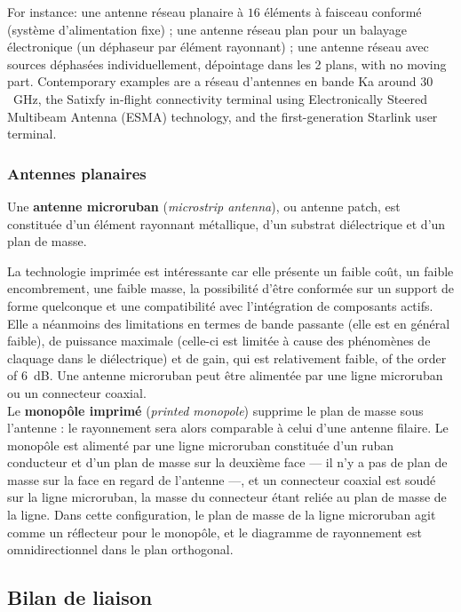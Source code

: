 For instance: une antenne réseau planaire à $16$ éléments à faisceau conformé
(système d'alimentation fixe) ; une antenne réseau plan pour un balayage
électronique (un déphaseur par élément rayonnant) ; une antenne réseau avec
sources déphasées individuellement, dépointage dans les 2 plans, with no moving
part. Contemporary examples are a réseau d'antennes en bande Ka around
$30$~GHz, the Satixfy in-flight connectivity terminal using Electronically
Steered Multibeam Antenna (ESMA) technology, and the first-generation Starlink
user terminal.

\subsubsection{Antennes planaires}

\begin{definition}
  Une \textbf{antenne microruban} (\textit{microstrip antenna}), ou antenne
  patch, est constituée d'un élément rayonnant métallique, d'un substrat
  diélectrique et d'un plan de masse.
\end{definition}

La technologie imprimée est intéressante car elle présente un faible coût, un
faible encombrement, une faible masse, la possibilité d'être conformée sur un
support de forme quelconque et une compatibilité avec l'intégration de
composants actifs. Elle a néanmoins des limitations en termes de bande passante
(elle est en général faible), de puissance maximale (celle-ci est limitée à
cause des phénomènes de claquage dans le diélectrique) et de gain, qui est
relativement faible, of the order of $6$~dB. Une antenne microruban peut être
alimentée par une ligne microruban ou un connecteur coaxial.\\

Le \textbf{monopôle imprimé} (\textit{printed monopole}) supprime le plan de
masse sous l'antenne : le rayonnement sera alors comparable à celui d'une
antenne filaire. Le monopôle est alimenté par une ligne microruban constituée
d'un ruban conducteur et d'un plan de masse sur la deuxième face --- il n'y a
pas de plan de masse sur la face en regard de l'antenne ---, et un connecteur
coaxial est soudé sur la ligne microruban, la masse du connecteur étant reliée
au plan de masse de la ligne. Dans cette configuration, le plan de masse de la
ligne microruban agit comme un réflecteur pour le monopôle, et le diagramme de
rayonnement est omnidirectionnel dans le plan orthogonal.

\subsection{Bilan de liaison}

